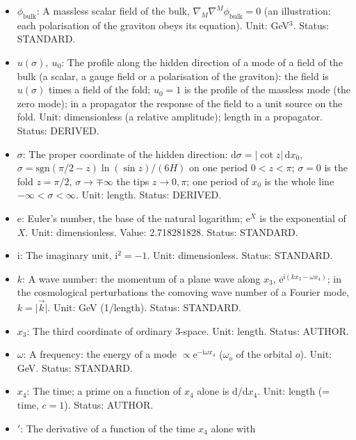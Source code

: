 \documentclass[
  10pt,
]{article}
\providecommand{\tightlist}{%
  \setlength{\itemsep}{0pt}\setlength{\parskip}{0pt}}
\begin{document}
\begin{itemize}
\tightlist
\item
  \(\phi_{\mathrm{bulk}}\): A massless scalar field of the bulk,
  \(\nabla_M\nabla^M\phi_{\mathrm{bulk}} = 0\) (an illustration: each
  polarisation of the graviton obeys its equation). Unit: GeV\(^3\).
  Status: STANDARD.
\item
  \(u(\sigma),\ u_0\): The profile along the hidden direction of a mode
  of a field of the bulk (a scalar, a gauge field or a polarisation of
  the graviton): the field is \(u(\sigma)\) times a field of the fold;
  \(u_0 = 1\) is the profile of the massless mode (the zero mode); in a
  propagator the response of the field to a unit source on the fold.
  Unit: dimensionless (a relative amplitude); length in a propagator.
  Status: DERIVED.
\item
  \(\sigma\): The proper coordinate of the hidden direction:
  \(\mathrm{d}\sigma = \lvert\cot z\rvert\,\mathrm{d}x_0\),
  \(\sigma = \mathrm{sgn}(\pi/2 - z)\ln(\sin z)/(6H)\) on one period
  \(0 < z < \pi\); \(\sigma = 0\) is the fold \(z = \pi/2\),
  \(\sigma \to \mp\infty\) the tips \(z \to 0, \pi\); one period of
  \(x_0\) is the whole line \(-\infty < \sigma < \infty\). Unit: length.
  Status: DERIVED.
\item
  \(\mathrm{e}\): Euler's number, the base of the natural logarithm;
  \(\mathrm{e}^{X}\) is the exponential of \(X\). Unit: dimensionless.
  Value: 2.718281828. Status: STANDARD.
\item
  \(\mathrm{i}\): The imaginary unit, \(\mathrm{i}^2 = -1\). Unit:
  dimensionless. Status: STANDARD.
\item
  \(k\): A wave number: the momentum of a plane wave along \(x_3\),
  \(\mathrm{e}^{\mathrm{i}(kx_3 - \omega x_4)}\); in the cosmological
  perturbations the comoving wave number of a Fourier mode,
  \(k = \lvert\vec k\rvert\). Unit: GeV (1/length). Status: STANDARD.
\item
  \(x_3\): The third coordinate of ordinary 3-space. Unit: length.
  Status: AUTHOR.
\item
  \(\omega\): A frequency: the energy of a mode
  \(\propto \mathrm{e}^{-\mathrm{i}\omega x_4}\) (\(\omega_o\) of the
  orbital \(o\)). Unit: GeV. Status: STANDARD.
\item
  \(x_4\): The time; a prime on a function of \(x_4\) alone is
  \(\mathrm{d}/\mathrm{d}x_4\). Unit: length (= time, \(c = 1\)).
  Status: AUTHOR.
\item
  \({}'\): The derivative of a function of the time \(x_4\) alone with

\end{itemize}
\end{document}
